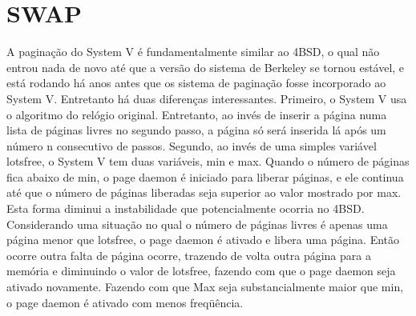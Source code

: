 \section{SWAP}
A paginação do System V é fundamentalmente similar ao 4BSD, o qual não entrou nada de novo até que a versão do sistema de Berkeley se tornou estável, e está rodando há anos antes que os sistema de paginação fosse incorporado ao System V. Entretanto há duas diferenças interessantes.
Primeiro, o System V usa o algoritmo do relógio original. Entretanto, ao invés de inserir a página numa lista de páginas livres no segundo passo, a página só será inserida lá após um número n consecutivo de passos.
Segundo, ao invés de uma simples variável lotsfree, o System V tem duas variáveis, min e max. Quando o número de páginas fica abaixo de min, o page daemon é iniciado para liberar páginas, e ele continua até que o número de páginas liberadas seja superior ao valor mostrado por max. Esta forma diminui a instabilidade que potencialmente ocorria no 4BSD. Considerando uma situação no qual o número de páginas livres é apenas uma página menor que lotsfree, o page daemon é ativado e libera uma página. Então ocorre outra falta de página ocorre, trazendo de volta outra página para a memória e diminuindo o valor de lotsfree, fazendo com que o page daemon seja ativado novamente. Fazendo com que Max seja substancialmente maior que min, o page daemon é ativado com menos freqüência.
